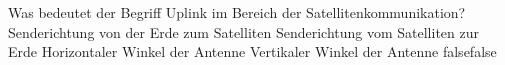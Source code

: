     {Was bedeutet der Begriff Uplink im Bereich der Satellitenkommunikation?}
    {Senderichtung von der Erde zum Satelliten}
    {Senderichtung vom Satelliten zur Erde}
    {Horizontaler Winkel der Antenne}
    {Vertikaler Winkel der Antenne}
    {false}{false}